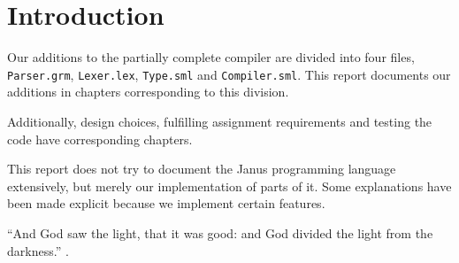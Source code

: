 \section{Introduction}
Our additions to the partially complete compiler are divided into four
files, {\tt Parser.grm}, {\tt Lexer.lex}, {\tt Type.sml} and {\tt Compiler.sml}.
This report documents our additions in chapters corresponding to this division.

Additionally, design choices, fulfilling assignment requirements and testing
the code have corresponding chapters.

This report does not try to document the Janus programming language extensively,
but merely our implementation of parts of it. Some explanations have been made
explicit because we implement certain features.

``And God saw the light, that it was good: and God divided the light from
the darkness.'' \cite[Gen. 1:4]{bible}.
